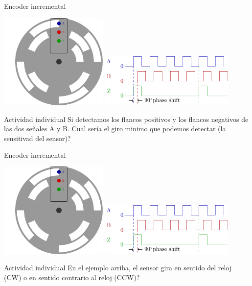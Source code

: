 \documentclass[presentation,aspectratio=169]{beamer}
\begin{document}
\begin{frame}[label={sec:org7cca9f2}]{Encoder incremental}
\begin{center}
\includegraphics[width=0.4\textwidth]{../../figures/encoder-disc}
\includegraphics[width=0.5\textwidth]{../../figures/encoder-signals}
\end{center}

\alert{Actividad individual} Si detectamos los flancos positivos \alert{y} los flancos negativos de las dos señales \textcolor{blue!80!black}{A} y \textcolor{red!80!black}{B}. Cual sería el giro minimo que podemos detectar (la sensitivad del sensor)?
\end{frame}


\begin{frame}[label={sec:org127e9ad}]{Encoder incremental}
\begin{center}
\includegraphics[width=0.4\textwidth]{../../figures/encoder-disc}
\includegraphics[width=0.5\textwidth]{../../figures/encoder-signals}
\end{center}

\alert{Actividad individual} En el ejemplo arriba, el sensor gira en sentido del reloj (CW) o en sentido contrario al reloj (CCW)?
\end{frame}
\end{document}
